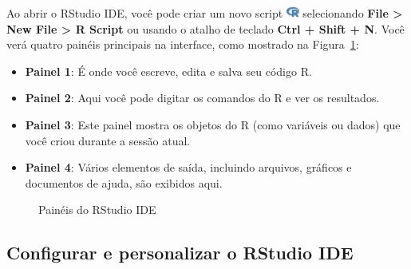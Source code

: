 \documentclass[
  letterpaper,
]{book}
\providecommand{\tightlist}{%
  \setlength{\itemsep}{0pt}\setlength{\parskip}{0pt}}\usepackage{longtable,booktabs,array}
\theoremstyle{definition}
\theoremstyle{plain}
\theoremstyle{remark}
\begin{document}
Ao abrir o RStudio IDE, você pode criar um novo script
\includegraphics[width=1.13em,height=1em]{getting_started_with_r_files/figure-pdf/fa-icon-9b00320707d42527dde67262afb33ded.pdf}
selecionando \textbf{File \textgreater{} New File \textgreater{} R
Script} ou usando o atalho de teclado \textbf{Ctrl + Shift + N}. Você
verá quatro painéis principais na interface, como mostrado na
Figura~\ref{fig-rstudio-ide-panels}:

\begin{itemize}
\tightlist
\item
  \textbf{Painel 1}: É onde você escreve, edita e salva seu código R.
\item
  \textbf{Painel 2}: Aqui você pode digitar os comandos do R e ver os
  resultados.
\item
  \textbf{Painel 3}: Este painel mostra os objetos do R (como variáveis
  ou dados) que você criou durante a sessão atual.
\item
  \textbf{Painel 4}: Vários elementos de saída, incluindo arquivos,
  gráficos e documentos de ajuda, são exibidos aqui.
\end{itemize}

\begin{figure}


\caption{\label{fig-rstudio-ide-panels}Painéis do RStudio IDE}

\end{figure}%

\subsection{Configurar e personalizar o RStudio
IDE}\label{configurar-e-personalizar-o-rstudio-ide}
\end{document}

